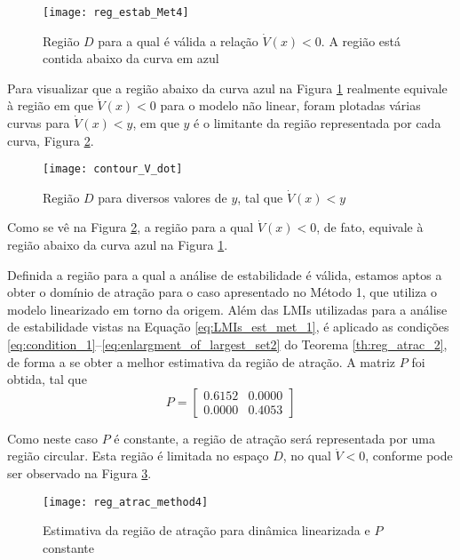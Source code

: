 \begin{figure}[htbp]
	\centering
	\texttt{[image: reg\_estab\_Met4]}
	\caption{Região $D$ para a qual é válida a relação $\dot{V}(x) < 0$. A região está contida abaixo da curva em azul}
	\label{fig:reg_estab_Met4}
\end{figure}

Para visualizar que a região abaixo da curva azul na Figura \ref{fig:reg_estab_Met4} realmente equivale à região em que $\dot{V}(x) < 0$ para o modelo não linear, foram plotadas várias curvas para $\dot{V}(x) < y$, em que $y$ é o limitante da região representada por cada curva, Figura \ref{fig:V_dot_levels}.

\begin{figure}[htbp]
	\centering
	\texttt{[image: contour\_V\_dot]}
	\caption{Região $D$ para diversos valores de $y$, tal que $\dot{V}(x) < y$}
	\label{fig:V_dot_levels}
\end{figure}

Como se vê na Figura \ref{fig:V_dot_levels}, a região para a qual $\dot{V}(x) < 0$, de fato, equivale à região abaixo da curva azul na Figura \ref{fig:reg_estab_Met4}.

Definida a região para a qual a análise de estabilidade é válida, estamos aptos a obter o domínio de atração para o caso apresentado no Método 1, que utiliza o modelo linearizado em torno da origem. Além das LMIs utilizadas para a análise de estabilidade vistas na Equação \ref{eq:LMIs_est_met_1}, é aplicado as condições \ref{eq:condition_1}--\ref{eq:enlargment_of_largest_set2} do Teorema \ref{th:reg_atrac_2}, de forma a se obter a melhor estimativa da região de atração. A matriz $P$ foi obtida, tal que
\begin{equation*}
P = \begin{bmatrix}0.6152&0.0000\\0.0000&0.4053\end{bmatrix}
\end{equation*}   

Como neste caso $P$ é constante, a região de atração será representada por uma região circular. Esta região é limitada no espaço $D$, no qual $\dot{V} < 0$, conforme pode ser observado na Figura \ref{fig:reg_atrac_met4}.

\begin{figure}[htbp]
	\centering
	\texttt{[image: reg\_atrac\_method4]}
	\caption{Estimativa da região de atração para dinâmica linearizada e $P$ constante}
	\label{fig:reg_atrac_met4}
\end{figure}


